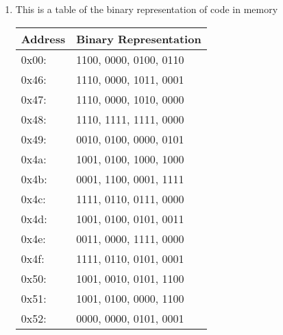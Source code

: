 \documentclass[12pt,letterpaper]{article}
\begin{document}
\begin{enumerate}
    \item This is a table of the binary representation of code in memory\\
    \begin{tabular}{l l}
        Address & Binary Representation \\
        \hline
        0x00: & 1100, 0000, 0100, 0110 \\
        0x46: & 1110, 0000, 1011, 0001 \\
        0x47: & 1110, 0000, 1010, 0000 \\
        0x48: & 1110, 1111, 1111, 0000 \\
        0x49: & 0010, 0100, 0000, 0101 \\
        0x4a: & 1001, 0100, 1000, 1000 \\
        0x4b: & 0001, 1100, 0001, 1111 \\
        0x4c: & 1111, 0110, 0111, 0000 \\
        0x4d: & 1001, 0100, 0101, 0011 \\
        0x4e: & 0011, 0000, 1111, 0000 \\
        0x4f: & 1111, 0110, 0101, 0001 \\
        0x50: & 1001, 0010, 0101, 1100 \\
        0x51: & 1001, 0100, 0000, 1100 \\
        0x52: & 0000, 0000, 0101, 0001 \\
    \end{tabular}
\end{enumerate}
\end{document}
